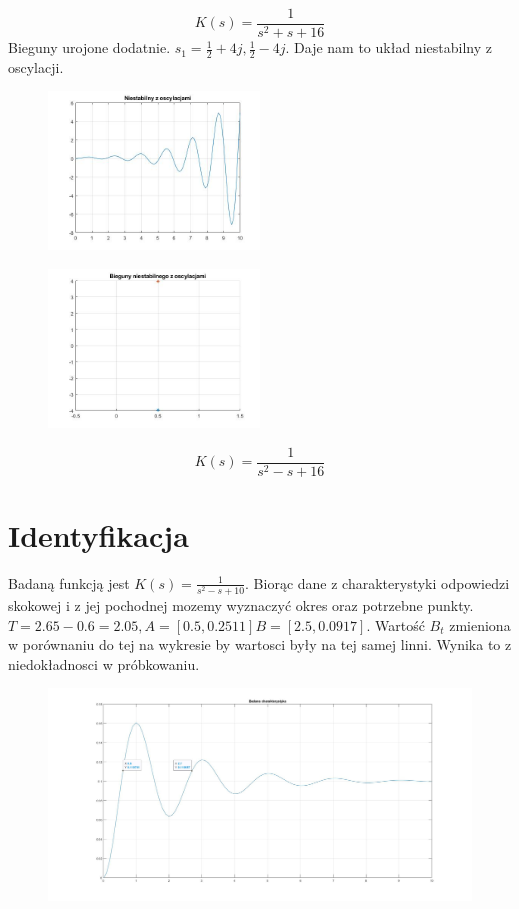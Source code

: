 \documentclass{article}
\begin{document}
$$ K(s) =\frac{1}{s^2+s+16} $$
\newpage
Bieguny urojone dodatnie. $s_1 = \frac{1}{2}+4j , \frac{1}{2}-4j$. Daje nam to układ niestabilny z oscylacji.

\begin{figure}
    \centering
    \includegraphics[width=0.5\textwidth]{oscniestab.jpg}
\end{figure}
\begin{figure}
    \centering
    \includegraphics[width=0.5\textwidth]{biegoscniestab.jpg}
\end{figure}
$$ K(s) =\frac{1}{s^2-s+16} $$

\section{Identyfikacja}
Badaną funkcją jest $ K(s) =\frac{1}{s^2-s+10} $. Biorąc dane z charakterystyki odpowiedzi skokowej i z jej pochodnej mozemy wyznaczyć okres oraz potrzebne punkty. $T = 2.65 - 0.6 = 2.05, A = [0.5,0.2511] B = [2.5,0.0917]$.
Wartość $B_t$ zmieniona w porównaniu do tej na wykresie by wartosci były na tej samej linni. Wynika to z niedokładnosci w próbkowaniu.

\begin{figure}
    \centering
    \includegraphics[width=13cm]{odp.jpg}
\end{figure}
\end{document}

